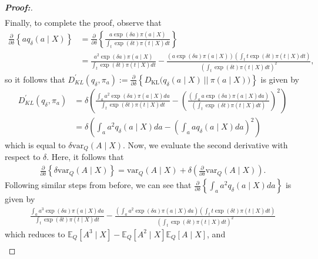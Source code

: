 \documentclass[11pt,twoside]{article}
\newcommand{\var}{\text{var}}
\theoremstyle{definition}
\theoremstyle{remark}
\begin{document}
\begin{proof}[\textbf{Proof:}]
\begin{align*}
    \end{align*}
    Finally, to complete the proof, observe that
    \begin{align*}
        \frac{\partial}{\partial \delta} \left\{ a q_\delta(a \mid X) \right\} &= \frac{\partial}{\partial \delta} \left\{ \frac{a \exp(\delta a) \pi(a \mid X)}{\int_t \exp(\delta t) \pi(t \mid X) dt} \right\} \\
        &= \frac{a^2 \exp(\delta a) \pi(a \mid X)}{\int_t \exp(\delta t) \pi(t \mid X) dt} - \frac{\left(a \exp(\delta a) \pi(a \mid X)\right)\left(\int_t t \exp(\delta t) \pi(t \mid X) dt \right)}{\left(\int_t \exp(\delta t) \pi(t \mid X) dt \right)^2},
    \end{align*}
    so it follows that $D^\prime_{KL}(q_\delta, \pi_a) := \frac{\partial}{\partial \delta} \left\{ D_{\text{KL}}\Big(q_\delta(a \mid X) \: || \: \pi(a \mid X) \Big) \right\}$ is given by
    \begin{align*}
        D^\prime_{KL}(q_\delta, \pi_a) &= \delta \left(\frac{\int_a a^2 \exp( \delta a) \pi(a \mid X) da}{\int_t \exp(\delta t) \pi(t \mid X) dt} - \left(\frac{\left(\int_a a \exp(\delta a) \pi(a \mid X) da\right)}{\left(\int_t \exp(\delta t) \pi(t \mid X) dt \right)} \right)^2 \right) \\
        &= \delta \left( \int_a a^2 q_\delta(a \mid X) da - \left( \int_a a q_\delta(a \mid X) da \right)^2 \right)
    \end{align*}
    which is equal to $\delta \var_Q(A \mid X)$. Now, we evaluate the second derivative with respect to $\delta$. Here, it follows that
    \begin{align*}
        \frac{\partial}{\partial \delta} \left\{ \delta \var_Q(A \mid X) \right\} = \var_Q(A \mid X) + \delta \left(\frac{\partial}{\partial \delta}\var_Q(A \mid X) \right).
    \end{align*}
    Following similar steps from before, we can see that $\frac{\partial}{\partial \delta} \left\{ \int_a a^2 q_\delta(a \mid X) da \right\}$ is given by
    \begin{align*}
         \frac{\int_a a^3 \exp(\delta a) \pi(a \mid X) da }{\int_t \exp(\delta t) \pi(t \mid X) dt} - \frac{\left(\int_a a^2 \exp(\delta a) \pi(a \mid X) da \right)\left(\int_t t \exp(\delta t) \pi(t \mid X) dt \right)}{\left(\int_t \exp(\delta t) \pi(t \mid X) dt \right)^2}
    \end{align*}
    which reduces to $\mathbb{E}_Q[A^3 \mid X] - \mathbb{E}_Q[A^2 \mid X] \mathbb{E}_Q[A \mid X]$, and
    \begin{align*}

\end{align*}
\end{proof}
\end{document}

